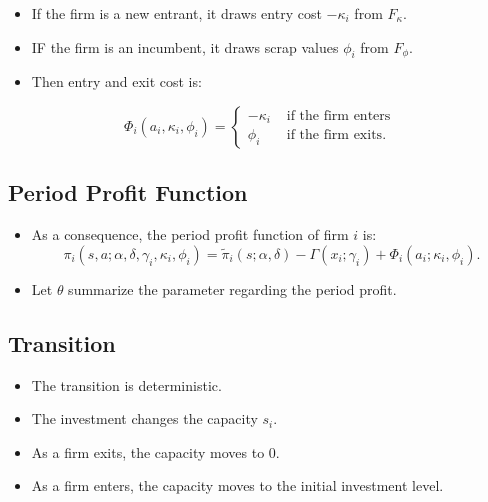\documentclass[
]{book}
\providecommand{\tightlist}{%
  \setlength{\itemsep}{0pt}\setlength{\parskip}{0pt}}
\begin{document}
\begin{itemize}
\tightlist
\item
  If the firm is a new entrant, it draws entry cost \(-\kappa_i\) from \(F_\kappa\).
\item
  IF the firm is an incumbent, it draws scrap values \(\phi_i\) from \(F_\phi\).
\item
  Then entry and exit cost is:
\end{itemize}

\begin{equation}
\Phi_i(a_i, \kappa_i, \phi_i) =
\begin{cases}
- \kappa_i &\text{   if the firm enters}\\
\phi_i &\text{   if the firm exits}.
\end{cases}
\end{equation}

\hypertarget{period-profit-function}{%
\subsection{Period Profit Function}\label{period-profit-function}}

\begin{itemize}
\tightlist
\item
  As a consequence, the period profit function of firm \(i\) is:
  \begin{equation}
  \pi_i(s, a; \alpha, \delta, \gamma_i, \kappa_i, \phi_i) = \tilde{\pi}_i(s; \alpha, \delta) - \Gamma(x_i; \gamma_i) + \Phi_i(a_i; \kappa_i, \phi_i).
  \end{equation}
\item
  Let \(\theta\) summarize the parameter regarding the period profit.
\end{itemize}

\hypertarget{transition}{%
\subsection{Transition}\label{transition}}

\begin{itemize}
\tightlist
\item
  The transition is deterministic.
\item
  The investment changes the capacity \(s_i\).
\item
  As a firm exits, the capacity moves to 0.
\item
  As a firm enters, the capacity moves to the initial investment level.
\end{itemize}
\end{document}

